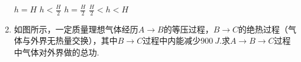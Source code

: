 \begin{enumerate}[leftmargin=0em]
\begin{minipage}[h!]{0.7\linewidth}
\vspace{0.3em}
\fourchoices
{$ h=H $}
{$h < \frac { H } { 2 }$}
{$h = \frac { H } { 2 }$}
{$\frac { H } { 2 } < h < H$}

\vspace{0.3em}
\end{minipage}
\hfill
\begin{minipage}[h!]{0.3\linewidth}
\flushright
\vspace{0.3em}

\vspace{0.3em}
\end{minipage}



\item 
{}
如图所示，一定质量理想气体经历$ A \rightarrow B $的等压过程，$ B \rightarrow C $的绝热过程（气体与外界无热量交换），其中$ B \rightarrow C $过程中内能减少$ 900\ J $.求$ A \rightarrow B \rightarrow C $过程中气体对外界做的总功.
\begin{figure}[h!]
\flushright

\end{figure}










\end{enumerate}


